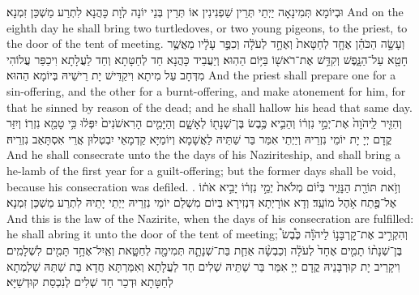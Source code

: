 {וּבְיוֹמָא תְּמִינָאָה יַיְתֵי תְּרֵין שַׁפְנִינִין אוֹ תְּרֵין בְּנֵי יוֹנָה לְוָת כָּהֲנָא לִתְרַע מַשְׁכַּן זִמְנָא׃}
{And on the eighth day he shall bring two turtledoves, or two young pigeons, to the priest, to the door of the tent of meeting.}{}
{וְעָשָׂ֣ה הַכֹּהֵ֗ן אֶחָ֤ד לְחַטָּאת֙ וְאֶחָ֣ד לְעֹלָ֔ה וְכִפֶּ֣ר עָלָ֔יו מֵאֲשֶׁ֥ר חָטָ֖א עַל־הַנָּ֑פֶשׁ וְקִדַּ֥שׁ אֶת־רֹאשׁ֖וֹ בַּיּ֥וֹם הַהֽוּא׃
}
{וְיַעֲבֵיד כָּהֲנָא חַד לְחַטָּתָא וְחַד לַעֲלָתָא וִיכַפַּר עֲלוֹהִי מִדְּחָב עַל מִיתָא וִיקַדֵּישׁ יָת רֵישֵׁיהּ בְּיוֹמָא הַהוּא׃}
{And the priest shall prepare one for a sin-offering, and the other for a burnt-offering, and make atonement for him, for that he sinned by reason of the dead; and he shall hallow his head that same day.}{}
{וְהִזִּ֤יר לַֽיהֹוָה֙ אֶת־יְמֵ֣י נִזְר֔וֹ וְהֵבִ֛יא כֶּ֥בֶשׂ בֶּן־שְׁנָת֖וֹ לְאָשָׁ֑ם וְהַיָּמִ֤ים הָרִאשֹׁנִים֙ יִפְּל֔וּ כִּ֥י טָמֵ֖א נִזְרֽוֹ׃
}
{וְיִזַּר קֳדָם יְיָ יָת יוֹמֵי נִזְרֵיהּ וְיַיְתֵי אִמַּר בַּר שַׁתֵּיהּ לַאֲשָׁמָא וְיוֹמַיָּא קַדְמָאֵי יִבְטְלוּן אֲרֵי אִסְתָּאַב נִזְרֵיהּ׃}
{And he shall consecrate unto the \lord\space the days of his Naziriteship, and shall bring a he-lamb of the first year for a guilt-offering; but the former days shall be void, because his consecration was defiled. .}{}
{וְזֹ֥את תּוֹרַ֖ת הַנָּזִ֑יר בְּי֗וֹם מְלֹאת֙ יְמֵ֣י נִזְר֔וֹ יָבִ֣יא אֹת֔וֹ אֶל־פֶּ֖תַח אֹ֥הֶל מוֹעֵֽד׃
}
{וְדָא אוֹרָיְתָא דִּנְזִירָא בְּיוֹם מִשְׁלַם יוֹמֵי נִזְרֵיהּ יַיְתֵי יָתֵיהּ לִתְרַע מַשְׁכַּן זִמְנָא׃}
{And this is the law of the Nazirite, when the days of his consecration are fulfilled: he shall abring it unto the door of the tent of meeting;}{}
{וְהִקְרִ֣יב אֶת־קׇרְבָּנ֣וֹ לַיהֹוָ֡ה כֶּ֩בֶשׂ֩ בֶּן־שְׁנָת֨וֹ תָמִ֤ים אֶחָד֙ לְעֹלָ֔ה וְכַבְשָׂ֨ה אַחַ֧ת בַּת־שְׁנָתָ֛הּ תְּמִימָ֖ה לְחַטָּ֑את וְאַֽיִל־אֶחָ֥ד תָּמִ֖ים לִשְׁלָמִֽים׃}
{וִיקָרֵיב יָת קוּרְבָּנֵיהּ קֳדָם יְיָ אִמַּר בַּר שַׁתֵּיהּ שְׁלִים חַד לַעֲלָתָא וְאִמַּרְתָּא חֲדָא בַּת שַׁתַּהּ שַׁלְמְתָא לְחַטָּתָא וּדְכַר חַד שְׁלִים לְנִכְסַת קוּדְשַׁיָּא׃}

